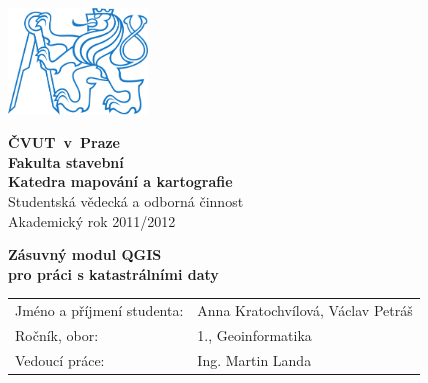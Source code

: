 {
\newcommand{\napisCVUT}{ČVUT~v~Praze}
\newcommand{\napisFS}{Fakulta stavební}
\newcommand{\napisSVOC}{Studentská vědecká a odborná činnost}
\newcommand{\napisAK}{Akademický rok  2011/2012}
\newcommand{\napisObor}{Geoinformatika}
\newcommand{\napisKatedra}{Katedra mapování a kartografie}
\newcommand{\napisVedouci}{Ing. Martin Landa}
\newcommand{\napisAutor}{Anna Kratochvílová, Václav Petráš}
\newcommand{\napisRocnik}{1.}
\newcommand{\napisNazevI}{Zásuvný modul QGIS}
\newcommand{\napisNazevII}{pro práci s katastrálními daty}

\begin{minipage}{0.2\textwidth}
\includegraphics[width=3.7cm]{logo_cvut_modre}
\end{minipage}
\hfill
\begin{minipage}{0.7\textwidth}
\begin{flushright}
\textsf{
\textbf{
\Large
\napisCVUT\\
\napisFS\\
\napisKatedra\\
}
\Large
\napisSVOC\\
\napisAK
}
\end{flushright}
\end{minipage}


\begin{center}
\vfill
\textsf{
\textbf{
\Huge
\napisNazevI\\
\napisNazevII\\
}}
\vfill
\end{center}

\newcommand{\rtu}[2]{\textsf{#1}&\textsf{#2}\\}
\begin{tabular}{ll}
\rtu{Jméno a příjmení studenta:}{\napisAutor}
\rtu{Ročník, obor:}{\napisRocnik, \napisObor}
\rtu{Vedoucí práce:}{\napisVedouci}
\end{tabular}
}
